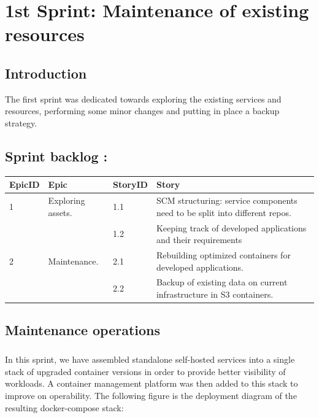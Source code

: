 \graphicspath{{./assets/}}
\setcounter{mtc}{3}
\chapter{1st Sprint: Maintenance of existing resources  }
\minitoc
\newpage


\section*{Introduction}
The first sprint was dedicated towards exploring the existing services and resources, performing some minor changes and putting in place a backup strategy.

\section{Sprint backlog :}



\begin{longtable}[!ht]{|m{1.5cm}|m{3cm}|m{1.5cm}|m{9cm}|}
\hline
{\textbf{EpicID}} & {\textbf{Epic}} & {\textbf{StoryID}} & {\textbf{Story}} \\
\hline
1 &  \raggedright Exploring assets.	& 1.1  & SCM structuring: service components need to be split into different repos. \\
\cline{3-4}
& & 1.2 &  	Keeping track of developed applications and their requirements \\
\hline
2  & Maintenance. &	2.1	 &  Rebuilding optimized containers for developed applications. \\
\cline{3-4}
& & 2.2 & Backup of existing data on current infrastructure in S3 containers.\\
\hline
\end{longtable}

\section{Maintenance operations}
\paragraph{}
In this sprint, we have assembled standalone self-hosted services into a single stack of upgraded container versions in order to provide better visibility of workloads. A container management platform was then added to this stack to improve on operability. 
The following figure is the deployment diagram of the resulting docker-compose stack:

